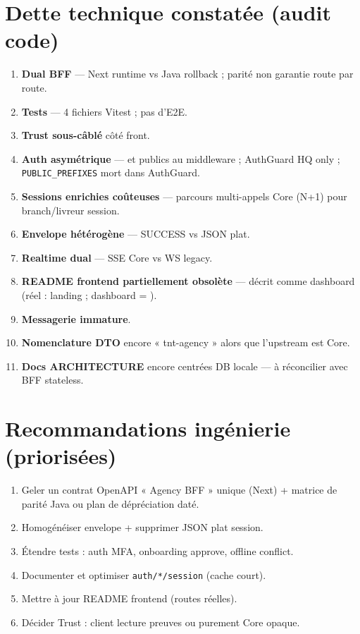 \section{Dette technique constatée (audit code)}

\begin{enumerate}[leftmargin=*]
  \item \textbf{Dual BFF} --- Next runtime vs Java rollback ; parité non
        garantie route par route.
  \item \textbf{Tests} --- 4 fichiers Vitest ; pas d'E2E.
  \item \textbf{Trust sous-câblé} côté front.
  \item \textbf{Auth asymétrique} ---  et  publics
        au middleware ; AuthGuard HQ only ; \texttt{PUBLIC\_PREFIXES} mort dans
        AuthGuard.
  \item \textbf{Sessions enrichies coûteuses} --- parcours multi-appels Core
        (N+1) pour branch/livreur session.
  \item \textbf{Envelope hétérogène} --- SUCCESS vs JSON plat.
  \item \textbf{Realtime dual} --- SSE Core vs WS legacy.
  \item \textbf{README frontend partiellement obsolète} --- décrit \api{/} comme
        dashboard (réel : landing ; dashboard = ).
  \item \textbf{Messagerie immature}.
  \item \textbf{Nomenclature DTO} encore « tnt-agency » alors que l'upstream
        est Core.
  \item \textbf{Docs ARCHITECTURE} encore centrées DB locale --- à réconcilier
        avec BFF stateless.
\end{enumerate}

\section{Recommandations ingénierie (priorisées)}

\begin{enumerate}
  \item Geler un contrat OpenAPI « Agency BFF » unique (Next) + matrice de
        parité Java ou plan de dépréciation daté.
  \item Homogénéiser envelope + supprimer JSON plat session.
  \item Étendre tests : auth MFA, onboarding approve, offline conflict.
  \item Documenter et optimiser \texttt{auth/*/session} (cache court).
  \item Mettre à jour README frontend (routes réelles).
  \item Décider Trust : client lecture preuves ou purement Core opaque.
\end{enumerate}

